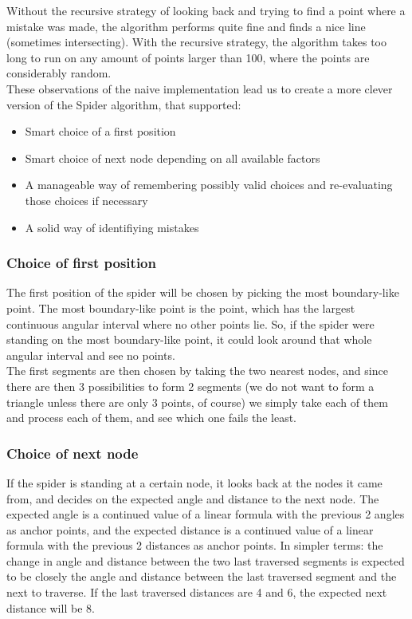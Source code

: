 \documentclass[11pt]{article}
\begin{document}
Without the recursive strategy of looking back and trying to find a point where a mistake was made, the algorithm performs quite fine and finds a nice line (sometimes intersecting). With the recursive strategy, the algorithm takes too long to run on any amount of points larger than 100, where the points are considerably random.\\

These observations of the naive implementation lead us to create a more clever version of the Spider algorithm, that supported:
\begin{itemize}
\item Smart choice of a first position
\item Smart choice of next node depending on all available factors
\item A manageable way of remembering possibly valid choices and re-evaluating those choices if necessary
\item A solid way of identifiying mistakes
\end{itemize}


\subsubsection{Choice of first position} 

The first position of the spider will be chosen by picking the most boundary-like point. The most boundary-like point is the point, which has the largest continuous angular interval where no other points lie. So, if the spider were standing on the most boundary-like point, it could look around that whole angular interval and see no points.\\

The first segments are then chosen by taking the two nearest nodes, and since there are then 3 possibilities to form 2 segments (we do not want to form a triangle unless there are only 3 points, of course) we simply take each of them and process each of them, and see which one fails the least.\\

\subsubsection{Choice of next node} 

If the spider is standing at a certain node, it looks back at the nodes it came from, and decides on the expected angle and distance to the next node. The expected angle is a continued value of a linear formula with the previous 2 angles as anchor points, and the expected distance is a continued value of a linear formula with the previous 2 distances as anchor points. In simpler terms: the change in angle and distance between the two last traversed segments is expected to be closely the angle and distance between the last traversed segment and the next to traverse. If the last traversed distances are 4 and 6, the expected next distance will be 8.\\
\end{document}
